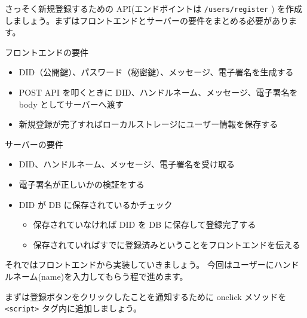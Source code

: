 さっそく新規登録するための API(エンドポイントは \texttt{/users/register}
)
を作成しましょう。まずはフロントエンドとサーバーの要件をまとめる必要があります。

フロントエンドの要件

\begin{itemize}
\tightlist
\item
  DID（公開鍵）、パスワード（秘密鍵）、メッセージ、電子署名を生成する
\item
  POST API を叩くときに DID、ハンドルネーム、メッセージ、電子署名を body
  としてサーバーへ渡す
\item
  新規登録が完了すればローカルストレージにユーザー情報を保存する
\end{itemize}

サーバーの要件

\begin{itemize}
\tightlist
\item
  DID、ハンドルネーム、メッセージ、電子署名を受け取る
\item
  電子署名が正しいかの検証をする
\item
  DID が DB に保存されているかチェック

  \begin{itemize}
  \tightlist
  \item
    保存されていなければ DID を DB に保存して登録完了する
  \item
    保存されていればすでに登録済みということをフロントエンドを伝える
  \end{itemize}
\end{itemize}

それではフロントエンドから実装していきましょう。
今回はユーザーにハンドルネーム(name)を入力してもらう程で進めます。

まずは登録ボタンをクリックしたことを通知するために onclick メソッドを
\texttt{\textless{}script\textgreater{}} タグ内に追加しましょう。

